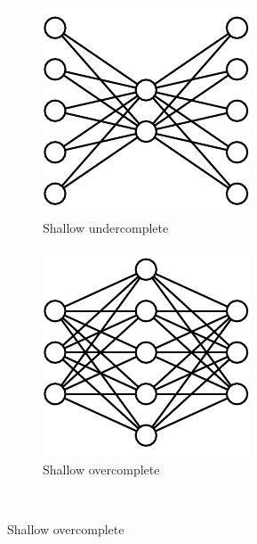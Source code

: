\begin{figure}[h!]
  \centering
  \hfill\begin{subfigure}[t]{0.45\figwidth}
		\centering
		\includegraphics[width=0.7\linewidth]{ShallowUndercomplete.pdf} 
		\caption{Shallow undercomplete} \label{Fig.ShallowUnder}
	\end{subfigure}
	\hfill
	\begin{subfigure}[t]{0.45\figwidth}
		\centering
		\includegraphics[width=0.7\linewidth]{ShallowOvercomplete.pdf} 
		\caption{Shallow overcomplete} \label{Fig.ShallowOver}
	\end{subfigure}\hfill~\\


\end{figure}
